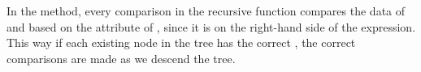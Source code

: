 In the  method, every comparison in the recursive  function compares the data of  and  based on the  attribute of , since it is on the right-hand side of the expression.
This way if each existing node in the tree has the correct , the correct comparisons are made as we descend the tree.

\begin{comment}
    def __init__(self, data_set):
        """Set the k attribute and fill the tree with the points in 'data_set'.

        Raises:
            TypeError: 'data_set' is not a NumPy array (of type np.ndarray).
        """

        # Validate the input type.
        if not isinstance(data_set, np.ndarray):
            raise TypeError("data_set must be a NumPy array.")

        # Set the root and dimension attributes.
        BST.__init__(self)
        self.k = data_set.shape[1]

        # Load the data in one point at a time.
        for point in data_set:
            self.insert(point)
\end{comment}

